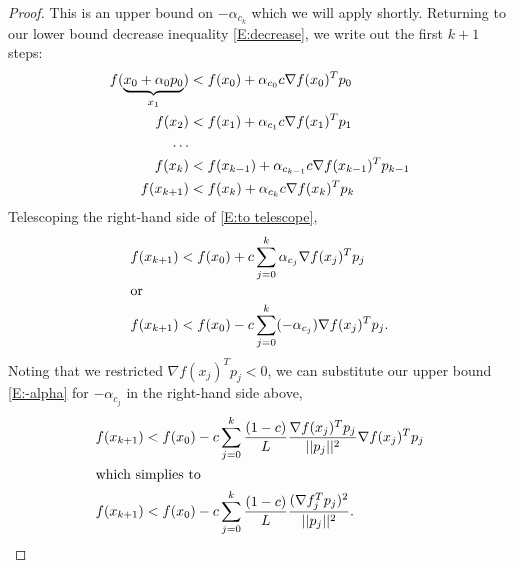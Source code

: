 \begin{proof}
This is an upper bound on $-\alpha_{c_k}$ which we will apply shortly.
Returning to our lower bound decrease inequality \eqref{E:decrease}, we write out the first $k+1$ steps:
\begin{align}
	f( \underbrace{x_0 + \alpha_0 p_0}_{x_1} ) &< f(x_0) + \alpha_{c_0} c \nabla f(x_0)^T p_0 \notag\\
	f( x_2 ) &< f(x_1) + \alpha_{c_1} c \nabla f(x_1)^T p_1 \notag \\
	\ldots \notag \\
	f( x_{k} ) &< f(x_{k-1}) + \alpha_{c_{k-1}} c \nabla f(x_{k-1})^T p_{k-1} \notag \\
	f( x_{k+1} ) &< f(x_k) + \alpha_{c_k} c \nabla f(x_k)^T p_k \label{E:to telescope}
\end{align}
Telescoping the right-hand side of \eqref{E:to telescope},
\begin{align}
	f( x_{k+1} ) &< f(x_0) + c \sum_{j=0}^{k} \alpha_{c_j} \nabla f(x_j)^T p_j \notag\\
	\intertext{or}
	f( x_{k+1} ) &< f(x_0) - c \sum_{j=0}^{k} (-\alpha_{c_j}) \nabla f(x_j)^T p_j. \notag
\end{align}
Noting that we restricted $\nabla f(x_j)^T p_j < 0$, we can substitute our upper bound \eqref{E:-alpha} for $-\alpha_{c_j}$ in the right-hand side above,
\begin{align}
	f( x_{k+1} ) &< f(x_0) - c \sum_{j=0}^{k} \frac{( 1 - c )}{L} \frac{ \nabla f(x_j)^T p_j}{ || p_j ||^2 } \nabla f(x_j)^T p_j \notag \\
	\intertext{which simplies to}
	f( x_{k+1} ) &< f(x_0) - c \sum_{j=0}^{k} \frac{( 1 - c )}{L} \frac{ (\nabla f_j^T p_j)^2}{ || p_j ||^2 }. \notag
\end{align}


\end{proof}
